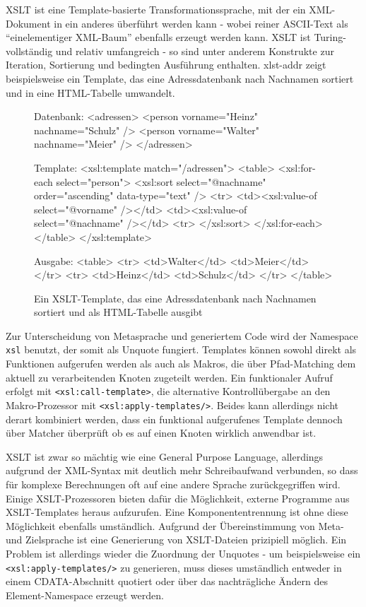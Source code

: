 \documentclass[11pt, a4paper, bibgerm]{scrbook}
\newcommand\icode[1]{\lstinline?#1?}
\newcommand\abb{}
\begin{document}
XSLT ist eine Template-basierte Transformationssprache, mit der ein
XML-Dokument in ein anderes überführt werden kann - wobei reiner
ASCII-Text als ``einelementiger XML-Baum'' ebenfalls erzeugt werden
kann. XSLT ist Turing-vollständig und relativ umfangreich - so sind
unter anderem Konstrukte zur Iteration, Sortierung und bedingten
Ausführung enthalten. \abb{xlst-addr} zeigt beispielsweise ein Template,
das eine Adressdatenbank nach Nachnamen sortiert und in eine
HTML-Tabelle umwandelt.
\begin{figure}
  \centering
  \begin{code}
Datenbank:
<adressen>
  <person vorname="Heinz" nachname="Schulz" />
  <person vorname="Walter" nachname="Meier" />
</adressen>

Template:
<xsl:template match="/adressen">
  <table>
    <xsl:for-each select="person">
      <xsl:sort select="@nachname" order="ascending" data-type="text" />
        <tr>
          <td><xsl:value-of select="@vorname" /></td>
          <td><xsl:value-of select="@nachname" /></td>
        <tr>
      </xsl:sort>
    </xsl:for-each>
  </table>
</xsl:template>    

Ausgabe:
<table>
  <tr>
    <td>Walter</td>
    <td>Meier</td>
  </tr>
  <tr>
    <td>Heinz</td>
    <td>Schulz</td>
  </tr>
</table>    
  \end{code} %
  \caption{Ein XSLT-Template, das eine Adressdatenbank nach Nachnamen
    sortiert und als HTML-Tabelle ausgibt}
  \label{magicl:fig:xslt-addr}
\end{figure}
Zur Unterscheidung von Metasprache und generiertem Code wird der
Namespace \icode{xsl} benutzt, der somit als Unquote fungiert. Templates
können sowohl direkt als Funktionen aufgerufen werden als auch als Makros,
die über Pfad-Matching dem aktuell zu verarbeitenden Knoten zugeteilt
werden. Ein funktionaler Aufruf erfolgt mit \icode{<xsl:call-template>},
die alternative Kontrollübergabe an den Makro-Prozessor mit
\icode{<xsl:apply-templates/>}. Beides kann allerdings nicht derart
kombiniert werden, dass ein funktional aufgerufenes Template dennoch
über Matcher überprüft ob es auf einen Knoten wirklich anwendbar ist.

XSLT ist zwar so mächtig wie eine General Purpose Language,
allerdings aufgrund der XML-Syntax mit deutlich mehr Schreibaufwand
verbunden, so dass für komplexe Berechnungen oft auf eine andere Sprache
zurückgegriffen wird. Einige XSLT-Prozessoren bieten dafür die
Möglichkeit, externe Programme aus XSLT-Templates heraus
aufzurufen. Eine Komponententrennung ist ohne diese Möglichkeit
ebenfalls umständlich. Aufgrund der Übereinstimmung von Meta- und
Zielsprache ist eine Generierung von XSLT-Dateien prizipiell
möglich. Ein Problem ist allerdings wieder die Zuordnung der Unquotes -
um beispielsweise ein \icode{<xsl:apply-templates/>} zu generieren, muss
dieses umständlich entweder in einem CDATA-Abschnitt quotiert oder über
das nachträgliche Ändern des Element-Namespace erzeugt werden.
\end{document}
